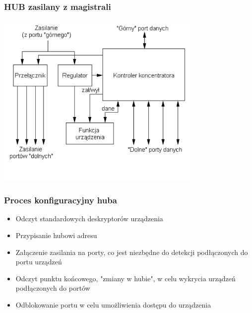 	\subsubsection{HUB zasilany z magistrali}
	\includegraphics[width=10cm]{./wyklady/USB_34_1.pdf}
	\subsubsection{Proces konfiguracyjny huba}
	\begin{itemize}
		\item Odczyt standardowych deskryptorów urządzenia
		\item Przypisanie hubowi adresu
		\item Załączenie zasilania na porty, co jest niezbędne do detekcji podłączonych do portu urządzeń
		\item Odczyt punktu końcowego, "zmiany w hubie", w celu wykrycia urządzeń podłączonych do portów
		\item Odblokowanie portu w celu umożliwienia dostępu do urządzenia
	\end{itemize}
